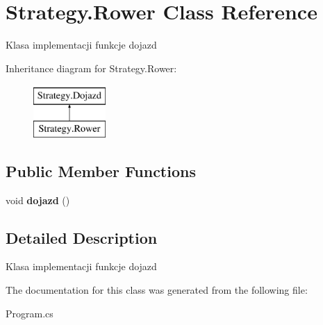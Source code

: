 \hypertarget{class_strategy_1_1_rower}{}\section{Strategy.\+Rower Class Reference}
\label{class_strategy_1_1_rower}


Klasa implementacji funkcje dojazd  


Inheritance diagram for Strategy.\+Rower\+:\begin{figure}[H]
\begin{center}
\leavevmode
\includegraphics[height=2.000000cm]{class_strategy_1_1_rower}
\end{center}
\end{figure}
\subsection*{Public Member Functions}
\begin{DoxyCompactItemize}
\item 
\mbox{\label{class_strategy_1_1_rower_ad1ec4490ccb956129ded7726930c8636}} 
void {\bfseries dojazd} ()
\end{DoxyCompactItemize}


\subsection{Detailed Description}
Klasa implementacji funkcje dojazd 



The documentation for this class was generated from the following file\+:\begin{DoxyCompactItemize}
\item 
Program.\+cs\end{DoxyCompactItemize}
